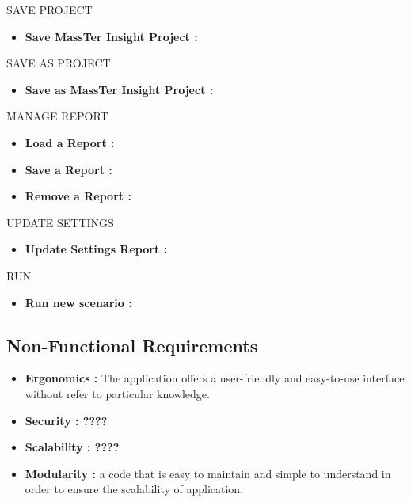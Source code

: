 	SAVE PROJECT
	\begin{itemize}
		\setlength{\itemindent}{+.5in}
		\item \textbf{Save MassTer Insight Project : } 
	\end{itemize}

	SAVE AS PROJECT
	\begin{itemize}
		\setlength{\itemindent}{+.5in}
		\item \textbf{Save as MassTer Insight Project : } 
	\end{itemize}


	
 
 	MANAGE REPORT
 		\begin{itemize}
 			\setlength{\itemindent}{+.5in}
 			\item \textbf{Load a Report : } 
 			\item \textbf{Save a Report : }
 			\item \textbf{Remove a Report : }
 	\end{itemize}
 
  	UPDATE SETTINGS
    \begin{itemize}
    	\setlength{\itemindent}{+.5in}
    	\item \textbf{Update Settings Report : }
   \end{itemize}

  	RUN
   \begin{itemize}
   	   \setlength{\itemindent}{+.5in}
 	   \item \textbf{Run new scenario : }
   \end{itemize}

    \clearpage
    \newpage

	\subsection{Non-Functional Requirements}
	\begin{itemize}
		\item \textbf{Ergonomics : }The application offers a user-friendly and easy-to-use interface without refer to particular knowledge.
		\item \textbf{Security : ????}
		\item \textbf{Scalability : ????}
		\item \textbf{Modularity : }a code that is easy to maintain and simple to understand in order to ensure the scalability of application. 
	\end{itemize}
	\clearpage
	\newpage
	
